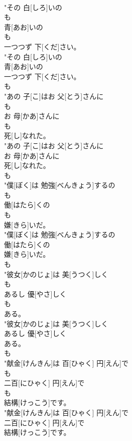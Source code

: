 \documentclass[8pt]{extreport}
\begin{document}
\begin{CJK}{UTF8}{min}
\\	"その 白[しろ]いの
\\	も
\\	青[あお]いの
\\	も
\\	一つつず 下[くだ]さい。
\\	"その 白[しろ]いの
\\	青[あお]いの
\\	一つつず 下[くだ]さい。
\\	も
\\	"あの 子[こ]はお 父[とう]さんに
\\	も
\\	お 母[かあ]さんに
\\	も
\\	死[し]なれた。
\\	"あの 子[こ]はお 父[とう]さんに
\\	お 母[かあ]さんに
\\	死[し]なれた。
\\	も
\\	"僕[ぼく]は 勉強[べんきょう]するの
\\	も
\\	働[はたら]くの
\\	も
\\	嫌[きら]いだ。
\\	"僕[ぼく]は 勉強[べんきょう]するの
\\	働[はたら]くの
\\	嫌[きら]いだ。
\\	も
\\	"彼女[かのじょ]は 美[うつく]しく
\\	も
\\	あるし 優[やさ]しく
\\	も
\\	ある。
\\	"彼女[かのじょ]は 美[うつく]しく
\\	あるし 優[やさ]しく
\\	ある。
\\	も
\\	"献金[けんきん]は 百[ひゃく] 円[えん]で
\\	も
\\	二百[にひゃく] 円[えん]で
\\	も
\\	結構[けっこう]です。
\\	"献金[けんきん]は 百[ひゃく] 円[えん]で
\\	二百[にひゃく] 円[えん]で
\\	結構[けっこう]です。

\end{CJK}
\end{document}
